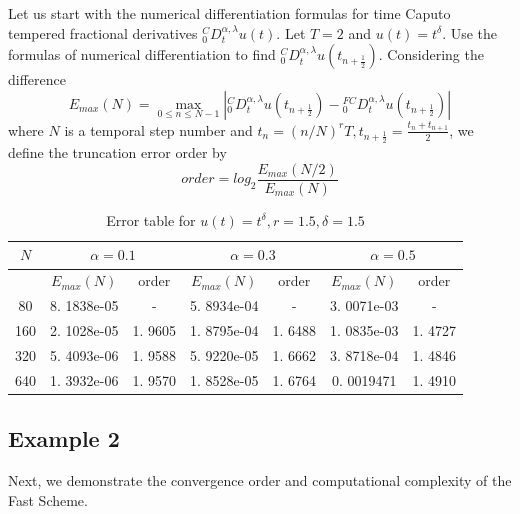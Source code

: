 \documentclass[10pt, reqno]{amsart}
\theoremstyle{remark}
\theoremstyle{definition}
\numberwithin{table}{section}
\begin{document}
Let us start with the numerical differentiation formulas for time Caputo tempered fractional derivatives ${}^C_0D_t^{\alpha, \lambda}u(t)$. Let $T = 2$ and $u(t) = t^\delta$.  Use the formulas of numerical differentiation to find ${}^C_0D_t^{\alpha, \lambda}u(t_{n+\frac{1}{2}})$. Considering the difference
$$
E_{max}(N)=\max_{0\leq n \leq N-1}|{}^C_0D_t^{\alpha, \lambda}u(t_{n+\frac{1}{2}})-{}^{FC}_0D_t^{\alpha, \lambda}u(t_{n+\frac{1}{2}})|
$$
where $N$ is a temporal step number and $t_n = (n/N)^r T, t_{n+\frac{1}{2}}=\frac{t_n+t_{n+1}}{2}$,  we define the truncation error
order by
$$
order = log_2\frac{E_{max}(N/2)}{E_{max}(N)}
$$
\begin{table}[h!]
\centering
\begin{tabular}{|c|c|c|c|c|c|c|}
\hline
$N$ & \multicolumn{2}{|c|}{$\alpha=0. 1$} & \multicolumn{2}{|c|}{$\alpha=0. 3$} & \multicolumn{2}{|c|}{$\alpha=0. 5$} \\ \hline
 & $E_{max}(N)$ & order & $E_{max}(N)$ & order & $E_{max}(N)$ & order \\ \hline
80  & 8. 1838e-05 & -   & 5. 8934e-04 & -   & 3. 0071e-03 & -   \\ \hline
160  & 2. 1028e-05 & 1. 9605 & 1. 8795e-04 &  1. 6488&1. 0835e-03  & 1. 4727 \\ \hline
320 & 5. 4093e-06 & 1. 9588 & 5. 9220e-05 & 1. 6662 & 3. 8718e-04 & 1. 4846 \\ \hline
640 & 1. 3932e-06 & 1. 9570 & 1. 8528e-05 & 1. 6764 & 0. 0019471 & 1. 4910 \\ \hline
\end{tabular}
\caption{Error table for $u(t) = t^\delta, r=1. 5,  \delta=1. 5$}
\label{table:errors}
\end{table}

\subsection{Example 2}

Next,  we demonstrate the convergence order and computational complexity of the Fast
Scheme. 
\end{document}
